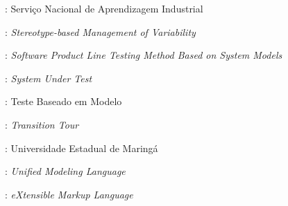 : Serviço Nacional de Aprendizagem Industrial

: \textit{Stereotype-based Management of Variability}

: \textit{Software Product Line Testing Method Based on System Models}

: \textit{System Under Test}

: Teste Baseado em Modelo

: \textit{Transition Tour}

: Universidade Estadual de Maringá

: \textit{Unified Modeling Language}

: \textit{eXtensible Markup Language}






